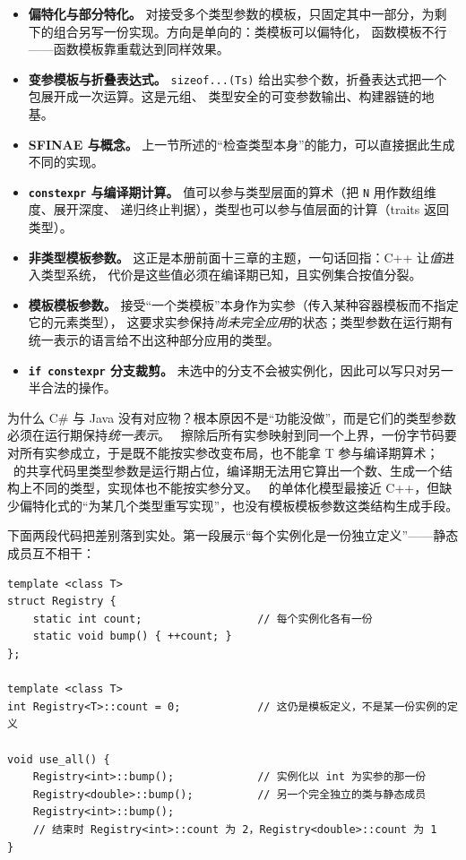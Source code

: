 \documentclass[12pt,a4paper,fontset=fandol]{ctexbook}
\newcommand{\javalabel}{%
  \tcbox[on line,colback=javaheadbg,colframe=javaheadbg,
    boxrule=0pt,arc=1pt,left=2pt,right=2pt,top=1pt,bottom=1pt,
    colupper=white,fontupper=\scriptsize\bfseries]{Java}}
\newcommand{\csharplabel}{%
  \tcbox[on line,colback=csharpheadbg,colframe=csharpheadbg,
    boxrule=0pt,arc=1pt,left=2pt,right=2pt,top=1pt,bottom=1pt,
    colupper=white,fontupper=\scriptsize\bfseries]{C\#}}
\newcommand{\rustlabel}{%
  \tcbox[on line,colback=rustheadbg,colframe=rustheadbg,
    boxrule=0pt,arc=1pt,left=2pt,right=2pt,top=1pt,bottom=1pt,
    colupper=white,fontupper=\scriptsize\bfseries]{Rust}}
\newcommand{\cpp}[1]{C++#1}
\newcommand{\kw}[1]{\texttt{#1}}
\begin{document}
\begin{itemize}
  \item \textbf{偏特化与部分特化。} 对接受多个类型参数的模板，只固定其中一部分，为剩下的组合另写一份实现。方向是单向的：类模板可以偏特化，
函数模板不行——函数模板靠重载达到同样效果。
  \item \textbf{变参模板与折叠表达式。} \kw{sizeof...(Ts)} 给出实参个数，折叠表达式把一个包展开成一次运算。这是元组、
类型安全的可变参数输出、构建器链的地基。
  \item \textbf{SFINAE 与概念。} 上一节所述的“检查类型本身”的能力，可以直接据此生成不同的实现。
  \item \textbf{\kw{constexpr} 与编译期计算。} 值可以参与类型层面的算术（把 \kw{N} 用作数组维度、展开深度、
递归终止判据），类型也可以参与值层面的计算（traits 返回类型）。
  \item \textbf{非类型模板参数。} 这正是本册前面十三章的主题，一句话回指：\cpp{} 让\emph{值}进入类型系统，
代价是这些值必须在编译期已知，且实例集合按值分裂。
  \item \textbf{模板模板参数。} 接受“一个类模板”本身作为实参（传入某种容器模板而不指定它的元素类型），
这要求实参保持\emph{尚未完全应用}的状态；类型参数在运行期有统一表示的语言给不出这种部分应用的类型。
  \item \textbf{\kw{if constexpr} 分支裁剪。} 未选中的分支不会被实例化，因此可以写只对另一半合法的操作。
\end{itemize}

为什么 C\# 与 Java 没有对应物？根本原因不是“功能没做”，而是它们的类型参数必须在运行期保持\emph{统一表示}。
\javalabel\ 擦除后所有实参映射到同一个上界，一份字节码要对所有实参成立，于是既不能按实参改变布局，也不能拿 T 参与编译期算术；
\csharplabel\ 的共享代码里类型参数是运行期占位，编译期无法用它算出一个数、生成一个结构上不同的类型，实现体也不能按实参分叉。
\rustlabel\ 的单体化模型最接近 \cpp{}，但缺少偏特化式的“为某几个类型重写实现”，也没有模板模板参数这类结构生成手段。

下面两段代码把差别落到实处。第一段展示“每个实例化是一份独立定义”——静态成员互不相干：

\begin{lstlisting}[style=cppstyle,caption={同一个类模板的两份实例：静态成员与生成符号各自独立}]
template <class T>
struct Registry {
    static int count;                  // 每个实例化各有一份
    static void bump() { ++count; }
};

template <class T>
int Registry<T>::count = 0;            // 这仍是模板定义，不是某一份实例的定义

void use_all() {
    Registry<int>::bump();             // 实例化以 int 为实参的那一份
    Registry<double>::bump();          // 另一个完全独立的类与静态成员
    Registry<int>::bump();
    // 结束时 Registry<int>::count 为 2，Registry<double>::count 为 1
}
\end{lstlisting}
\end{document}
